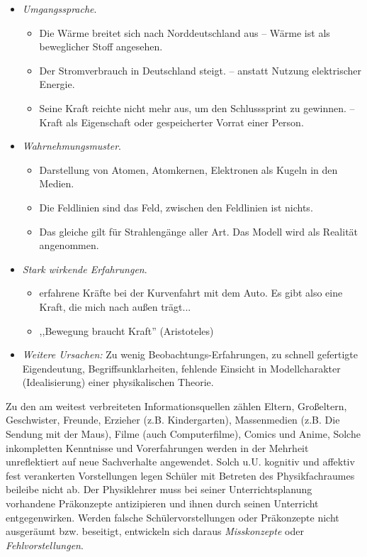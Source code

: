 \begin{itemize}
\item
\emph{Umgangssprache}. \begin{beisp2}
	\begin{itemize}
		\item {\glqq}Die W{\"a}rme breitet sich nach Norddeutschland aus{\grqq} --  W{\"a}rme ist als beweglicher Stoff angesehen.
		\item {\glqq}Der Stromverbrauch in Deutschland steigt.{\grqq} --  anstatt Nutzung elektrischer Energie.
		\item {\glqq}Seine Kraft reichte nicht mehr aus, um den Schlusssprint zu gewinnen.{\grqq} -- Kraft als Eigenschaft oder gespeicherter Vorrat einer Person. 
	\end{itemize}
\end{beisp2}
\item
\emph{Wahrnehmungsmuster}. \begin{beisp2}
	\begin{itemize}
		\item Darstellung von Atomen, Atomkernen, Elektronen als Kugeln in den Medien.
		\item Die Feldlinien sind das Feld, zwischen den Feldlinien ist nichts.
		\item Das gleiche gilt f{\"u}r Strahleng{\"a}nge aller Art. Das Modell wird  als Realit{\"a}t angenommen.
	\end{itemize}
\end{beisp2}
\item
\emph{Stark wirkende Erfahrungen}. \begin{beisp2}
	\begin{itemize}
		\item erfahrene Kr{\"a}fte bei der Kurvenfahrt mit dem Auto. Es gibt also eine Kraft, die mich nach au{\ss}en tr{\"a}gt...
		\item ,,Bewegung braucht Kraft'' (Aristoteles)
	\end{itemize}
\end{beisp2}
\item
\emph{Weitere Ursachen:} Zu wenig Beobachtungs-Erfahrungen, zu schnell gefertigte Eigendeutung, Begriffsunklarheiten, fehlende Einsicht in Modellcharakter (Idealisierung) einer physikalischen Theorie. 
\end{itemize}

Zu den am weitest verbreiteten Informationsquellen z{\"a}hlen Eltern, Gro{\ss}eltern, Geschwister, Freunde, Erzieher (z.B. Kindergarten), Massenmedien (z.B. Die Sendung mit der Maus), Filme (auch Computerfilme), Comics und Anime,  Solche inkompletten Kenntnisse und Vorerfahrungen werden in der Mehrheit unreflektiert auf neue Sachverhalte angewendet.
\mip
Solch u.U. kognitiv und affektiv fest verankerten Vorstellungen legen Sch{\"u}ler mit Betreten des Physikfachraumes beileibe nicht ab. Der Physiklehrer muss bei seiner Unterrichtsplanung  vorhandene Pr{\"a}konzepte antizipieren und ihnen durch seinen Unterricht entgegenwirken. Werden falsche Schülervorstellungen oder Pr{\"a}konzepte nicht ausger{\"a}umt bzw. beseitigt, entwickeln sich daraus \emph{Misskonzepte} oder \emph{Fehlvorstellungen}.


